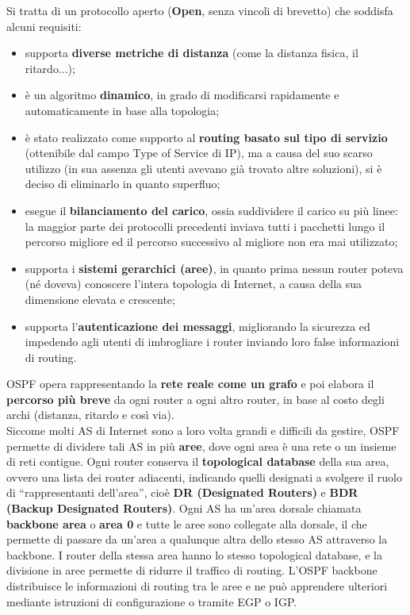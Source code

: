 \documentclass{article}
\begin{document}
        Si tratta di un protocollo aperto (\textbf{Open}, senza vincoli di brevetto) che soddisfa alcuni requisiti:
        
        \begin{itemize}
            \item supporta \textbf{diverse metriche di distanza} (come la distanza fisica, il ritardo...);
            \item è un algoritmo \textbf{dinamico}, in grado di modificarsi rapidamente e automaticamente in
            base alla topologia;
            \item è stato realizzato come supporto al \textbf{routing basato sul tipo di servizio} (ottenibile dal
            campo Type of Service di IP), ma a causa del suo scarso utilizzo (in sua assenza gli utenti
            avevano già trovato altre soluzioni), si è deciso di eliminarlo in quanto superfluo;
            \item esegue il \textbf{bilanciamento del carico}, ossia suddividere il carico su più linee: la maggior
            parte dei protocolli precedenti inviava tutti i pacchetti lungo il percorso migliore ed il
            percorso successivo al migliore non era mai utilizzato;
            \item supporta i \textbf{sistemi gerarchici (aree)}, in quanto prima nessun router poteva (né
            doveva) conoscere l’intera topologia di Internet, a causa della sua dimensione elevata e
            crescente;
            \item supporta l’\textbf{autenticazione dei messaggi}, migliorando la sicurezza ed impedendo agli
            utenti di imbrogliare i router inviando loro false informazioni di routing.
        \end{itemize}

        OSPF opera rappresentando la \textbf{rete reale come un grafo} e poi elabora il \textbf{percorso più breve}
        da ogni router a ogni altro router, in base al costo degli archi (distanza, ritardo e così via).\\
        
        Siccome molti AS di Internet sono a loro volta grandi e difficili da gestire, OSPF permette di
        dividere tali AS in più \textbf{aree}, dove ogni area è una rete o un insieme di reti contigue. Ogni router
        conserva il \textbf{topological database} della sua area, ovvero una lista dei router adiacenti,
        indicando quelli designati a svolgere il ruolo di “rappresentanti dell’area”, cioè \textbf{DR (Designated
        Routers)} e \textbf{BDR (Backup Designated Routers)}. Ogni AS ha un’area dorsale chiamata
        \textbf{backbone area} o \textbf{area 0} e tutte le aree sono collegate alla dorsale, il che permette di passare
        da un’area a qualunque altra dello stesso AS attraverso la backbone.
        I router della stessa area hanno lo stesso topological database, e la divisione in aree permette
        di ridurre il traffico di routing. L’OSPF backbone distribuisce le informazioni di routing tra le
        aree e ne può apprendere ulteriori mediante istruzioni di configurazione o tramite EGP o IGP.\\
\end{document}
